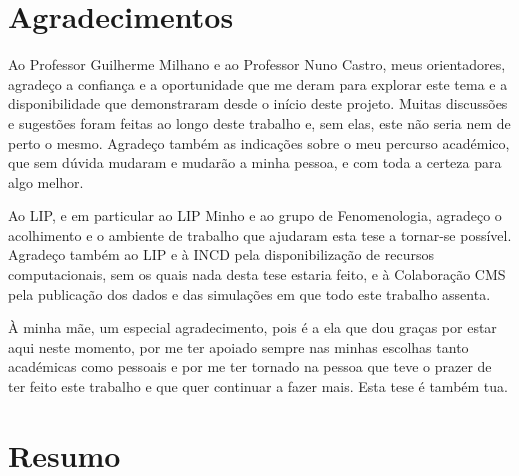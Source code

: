 \documentclass{istdissertacao}
\begin{document}

\declaracao

\frontmatterIST


\chapter*{Agradecimentos}

Ao Professor Guilherme Milhano e ao Professor Nuno Castro, meus orientadores,
agradeço a confiança e a oportunidade que me deram para explorar este tema e
a disponibilidade que demonstraram desde o início deste projeto. Muitas discussões
e sugestões foram feitas ao longo deste trabalho e, sem elas, este não seria nem de
perto o mesmo. Agradeço também as indicações sobre o meu percurso académico, que sem
dúvida mudaram e mudarão a minha pessoa, e com toda a certeza para algo melhor.

Ao LIP, e em particular ao LIP Minho e ao grupo de Fenomenologia, agradeço o
acolhimento e o ambiente de trabalho que ajudaram esta tese a tornar-se possível.
Agradeço também ao LIP e à INCD pela disponibilização de recursos computacionais,
sem os quais nada desta tese estaria feito, e à Colaboração CMS pela
publicação dos dados e das simulações em que todo este trabalho assenta.

À minha mãe, um especial agradecimento, pois é a ela que dou graças por estar aqui
neste momento, por me ter apoiado sempre nas minhas escolhas tanto académicas como
pessoais e por me ter tornado na pessoa que teve o prazer de ter feito este trabalho e
que quer continuar a fazer mais. Esta tese é também tua.

\chapter*{Resumo}
\end{document}
